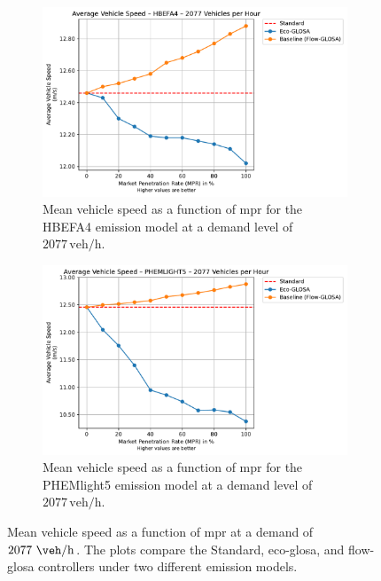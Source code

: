 \begin{figure}[htb]
  \centering
  \begin{subfigure}[b]{0.49\textwidth}
    \includegraphics[width=\textwidth]{data/img/AverageVehicleSpeed/AverageVehicleSpeed_HBEFA4_Cars2077.pdf}
    \caption{Mean vehicle speed as a function of \ac{mpr} for the HBEFA4 emission model at a demand level of $2077\,\mathrm{veh/h}$.}
    \label{fig:MeanSpeed_HBEFA4_2077}
  \end{subfigure}\hfill
  \begin{subfigure}[b]{0.49\textwidth}
    \includegraphics[width=\textwidth]{data/img/AverageVehicleSpeed/AverageVehicleSpeed_PHEMLIGHT5_Cars2077.pdf}
    \caption{Mean vehicle speed as a function of \ac{mpr} for the PHEMlight5 emission model at a demand level of $2077\,\mathrm{veh/h}$.}
    \label{fig:MeanSpeed_PHEM_2077}
  \end{subfigure}
  \caption[Mean vehicle speed vs. \ac{mpr} at $2077~\unit{\veh\per\hour}$]{Mean vehicle speed as a function of \ac{mpr} at a demand of $2077~\unit{\veh\per\hour}$. The plots compare the Standard, \ac{eco-glosa}, and \ac{flow-glosa} controllers under two different emission models.}
\label{fig:MeanSpeed_2077}
\end{figure}


